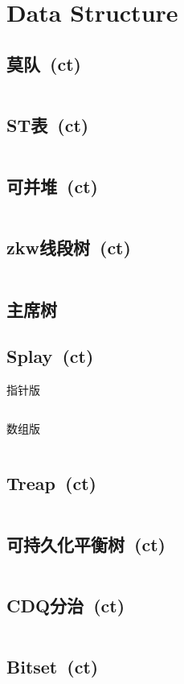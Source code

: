 \chapter{Data Structure}
\section{莫队\ \small(ct)}
\inputminted{cpp}{DataStructure/mo_dui.cpp}
\section{ST表\ \small(ct)}
\inputminted{cpp}{DataStructure/st_table.cpp}
\section{可并堆\ \small(ct)}
\inputminted{cpp}{DataStructure/mergeable_heap.cpp}
\section{zkw线段树\ \small(ct)}
\inputminted{cpp}{DataStructure/zkw_segment_tree.cpp}
\section{主席树}
\section{Splay\ \small(ct)}
指针版
\inputminted{cpp}{DataStructure/splay.cpp}
数组版
\inputminted{cpp}{DataStructure/splay_arr.cpp}
\section{Treap\ \small(ct)}
\inputminted{cpp}{DataStructure/treap.cpp}
\section{可持久化平衡树\ \small(ct)}
\inputminted{cpp}{DataStructure/functional_treap.cpp}
\section{CDQ分治\ \small(ct)}
\inputminted{cpp}{DataStructure/cdq_divide.cpp}
\section{Bitset\ \small(ct)}
\inputminted{cpp}{DataStructure/bitset.cpp}